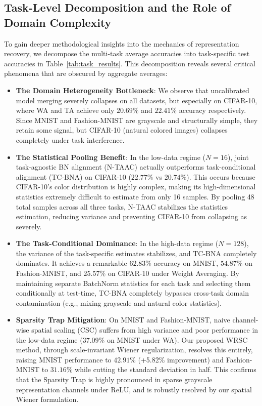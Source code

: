 \documentclass{article}
\theoremstyle{plain}
\theoremstyle{definition}
\theoremstyle{remark}
\begin{document}
\subsection{Task-Level Decomposition and the Role of Domain Complexity}
To gain deeper methodological insights into the mechanics of representation recovery, we decompose the multi-task average accuracies into task-specific test accuracies in Table~\ref{tab:task_results}. This decomposition reveals several critical phenomena that are obscured by aggregate averages:
\begin{itemize}
    \item \textbf{The Domain Heterogeneity Bottleneck}: We observe that uncalibrated model merging severely collapses on all datasets, but especially on CIFAR-10, where WA and TA achieve only $20.69\%$ and $22.41\%$ accuracy respectively. Since MNIST and Fashion-MNIST are grayscale and structurally simple, they retain some signal, but CIFAR-10 (natural colored images) collapses completely under task interference.
    \item \textbf{The Statistical Pooling Benefit}: In the low-data regime ($N=16$), joint task-agnostic BN alignment (N-TAAC) actually outperforms task-conditional alignment (TC-BNA) on CIFAR-10 ($22.77\%$ vs $20.74\%$). This occurs because CIFAR-10's color distribution is highly complex, making its high-dimensional statistics extremely difficult to estimate from only 16 samples. By pooling 48 total samples across all three tasks, N-TAAC stabilizes the statistics estimation, reducing variance and preventing CIFAR-10 from collapsing as severely.
    \item \textbf{The Task-Conditional Dominance}: In the high-data regime ($N=128$), the variance of the task-specific estimates stabilizes, and TC-BNA completely dominates. It achieves a remarkable $62.83\%$ accuracy on MNIST, $54.87\%$ on Fashion-MNIST, and $25.57\%$ on CIFAR-10 under Weight Averaging. By maintaining separate BatchNorm statistics for each task and selecting them conditionally at test-time, TC-BNA completely bypasses cross-task domain contamination (e.g., mixing grayscale and natural color statistics).
    \item \textbf{Sparsity Trap Mitigation}: On MNIST and Fashion-MNIST, naive channel-wise spatial scaling (CSC) suffers from high variance and poor performance in the low-data regime ($37.09\%$ on MNIST under WA). Our proposed WRSC method, through scale-invariant Wiener regularization, resolves this entirely, raising MNIST performance to $42.91\%$ (+5.82\% improvement) and Fashion-MNIST to $31.16\%$ while cutting the standard deviation in half. This confirms that the Sparsity Trap is highly pronounced in sparse grayscale representation channels under ReLU, and is robustly resolved by our spatial Wiener formulation.
\end{itemize}
\end{document}
